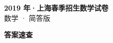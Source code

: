 \documentclass[zihao=-4, a4paper]{ctexart}
\begin{document}
\begin{center}
  {\Large\bfseries 2019 年·上海春季招生数学试卷}\\[4pt]
  {\large 数学 · 简答版}
\end{center}
\medskip
{}

\clearpage
{}
\begin{center}{\Large\bfseries 答案速查}\end{center}
\medskip

\end{document}
